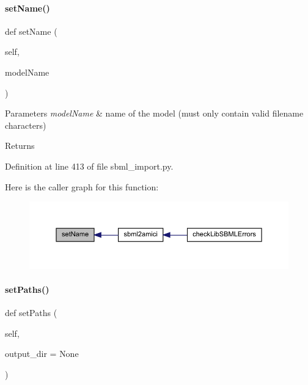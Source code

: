 \paragraph{\texorpdfstring{set\+Name()}{setName()}}
{\footnotesize\ttfamily def set\+Name (\begin{DoxyParamCaption}\item[{}]{self,  }\item[{}]{model\+Name }\end{DoxyParamCaption})}


\begin{DoxyParams}{Parameters}
{\em model\+Name} & name of the model (must only contain valid filename characters)\\
\hline
\end{DoxyParams}
\begin{DoxyReturn}{Returns}

\end{DoxyReturn}


Definition at line 413 of file sbml\+\_\+import.\+py.

Here is the caller graph for this function\+:
\nopagebreak
\begin{figure}[H]
\begin{center}
\leavevmode
\includegraphics[width=350pt]{classamici_1_1sbml__import_1_1_sbml_importer_af9ec4a20beb62b41663733ecfc8e1713_icgraph}
\end{center}
\end{figure}
\mbox{\label{classamici_1_1sbml__import_1_1_sbml_importer_aa444f1d8b15c02fc5e2252cad86ae0ab}} 
\paragraph{\texorpdfstring{set\+Paths()}{setPaths()}}
{\footnotesize\ttfamily def set\+Paths (\begin{DoxyParamCaption}\item[{}]{self,  }\item[{}]{output\+\_\+dir = {\ttfamily None} }\end{DoxyParamCaption})}


